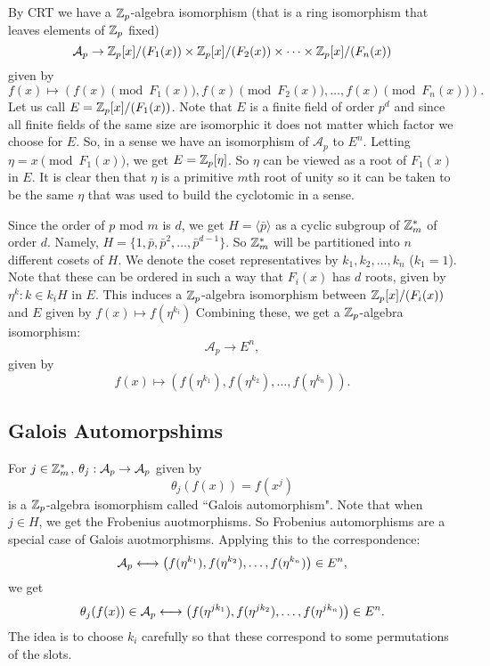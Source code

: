 \documentclass[12pt]{article}
\theoremstyle{plain}
\theoremstyle{definition}
\theoremstyle{remark}
\begin{document}
By CRT we have a $\mathbb{Z}_p$-algebra isomorphism (that is a ring isomorphism that leaves elements of $\mathbb{Z}_p$ fixed)
$$\mathcal{A}_p \rightarrow \mathbb{Z}_p[x]/(F_1(x))\times \mathbb{Z}_p[x]/(F_2(x)) \times \dots \times \mathbb{Z}_p[x]/(F_n(x))$$ given by
$$f(x)\mapsto \left (f(x) \pmod{F_1(x)}, f(x) \pmod{F_2(x)}, \dots, f(x) \pmod{F_n(x)}\right).$$
Let us call $E = \mathbb{Z}_p[x]/(F_1(x))$. Note that $E$ is a finite field of order $p^d$ and since all finite fields of the same size are isomorphic it does not matter which factor we choose for $E$. So, in a sense we have an isomorphism of $\mathcal{A}_p$ to $E^n$.
Letting $\eta = x \pmod{F_1(x)}$, we get $E=\mathbb{Z}_p[\eta]$. So $\eta$ can be viewed as a root of $F_1(x)$ in $E$. It is clear then that $\eta$ is a primitive $m$th root of unity so it can be taken to be the same $\eta$ that was used to build the cyclotomic in a sense.

Since the order of $p$ mod $m$ is $d$, we get $H=\langle \bar{p}\rangle$ as a cyclic subgroup of $\mathbb{Z}_m^*$ of order $d$. Namely, $H=\{1, \bar{p}, \bar{p}^2, \dots, \bar{p}^{d-1}\}$.
So $\mathbb{Z}_m^*$ will be partitioned into $n$ different cosets of $H$. We denote the coset representatives by $k_1, k_2, \dots, k_n$ ($k_1=1$). Note that these can be ordered in such a way that $F_i(x)$ has $d$ roots, given by $\eta^k : k\in k_iH$ in $E$.
This induces a $\mathbb{Z}_p$-algebra isomorphism between
$\mathbb{Z}_p[x]/(F_i(x))$ and $E$ given by $f(x) \mapsto f(\eta^{k_i})$
Combining these, we get a $\mathbb{Z}_p$-algebra isomorphism:
$$\mathcal{A}_p\rightarrow E^n,$$ given by
$$f(x) \mapsto \left (f(\eta^{k_1}), f(\eta^{k_2}), \dots, f(\eta^{k_n})\right ).$$

\subsection{Galois Automorpshims}
For $j\in \mathbb{Z}_m^*$, $\theta_j:\mathcal{A}_p\rightarrow \mathcal{A}_p$ given by
$$\theta_j(f(x)) = f(x^j)$$ is a $\mathbb{Z}_p$-algebra isomorphism called ``Galois automorphism". Note that when $j\in H$, we get the Frobenius auotmorphisms. So Frobenius automorphisms are a special case of Galois auotmorphisms.
Applying this to the correspondence:
$$\mathcal{A}_p \longleftrightarrow \left (f(\eta^{k_1}), f(\eta^{k_2}), \dots, f(\eta^{k_n})\right ) \in E^n,$$ we get
$$\theta_j(f(x)) \in \mathcal{A}_p \longleftrightarrow \left (f(\eta^{jk_1}), f(\eta^{jk_2}), \dots, f(\eta^{jk_n})\right )\in E^n.$$
The idea is to choose $k_i$ carefully so that these correspond to some permutations of the slots.
\end{document}
